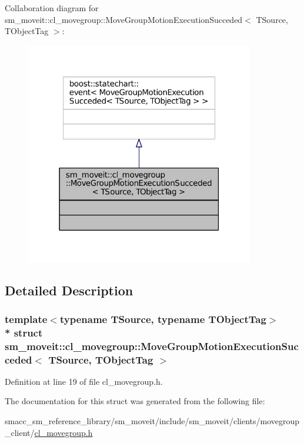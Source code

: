 Collaboration diagram for sm\+\_\+moveit\+:\+:cl\+\_\+movegroup\+:\+:Move\+Group\+Motion\+Execution\+Succeded$<$ T\+Source, T\+Object\+Tag $>$\+:
\nopagebreak
\begin{figure}[H]
\begin{center}
\leavevmode
\includegraphics[width=283pt]{structsm__moveit_1_1cl__movegroup_1_1MoveGroupMotionExecutionSucceded__coll__graph}
\end{center}
\end{figure}


\subsection{Detailed Description}
\subsubsection*{template$<$typename T\+Source, typename T\+Object\+Tag$>$\\*
struct sm\+\_\+moveit\+::cl\+\_\+movegroup\+::\+Move\+Group\+Motion\+Execution\+Succeded$<$ T\+Source, T\+Object\+Tag $>$}



Definition at line 19 of file cl\+\_\+movegroup.\+h.



The documentation for this struct was generated from the following file\+:\begin{DoxyCompactItemize}
\item 
smacc\+\_\+sm\+\_\+reference\+\_\+library/sm\+\_\+moveit/include/sm\+\_\+moveit/clients/movegroup\+\_\+client/\hyperlink{cl__movegroup_8h}{cl\+\_\+movegroup.\+h}\end{DoxyCompactItemize}
